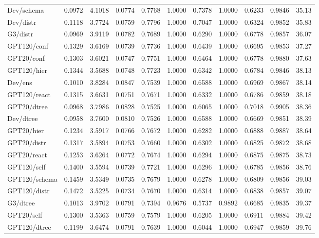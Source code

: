 \begin{table}[t]
\begin{tabular}{lrrrrrrrrrr}
Dev/schema & 0.0972 & 4.1018 & 0.0774 & 0.7768 & 1.0000 & 0.7378 & 1.0000 & 0.6233 & 0.9846 & 35.13 \\
Dev/distr & 0.1118 & 3.7724 & 0.0759 & 0.7796 & 1.0000 & 0.7047 & 1.0000 & 0.6324 & 0.9852 & 35.83 \\
G3/distr & 0.0969 & 3.9119 & 0.0782 & 0.7689 & 1.0000 & 0.6290 & 1.0000 & 0.6778 & 0.9857 & 36.07 \\
GPT120/conf & 0.1329 & 3.6169 & 0.0739 & 0.7736 & 1.0000 & 0.6439 & 1.0000 & 0.6695 & 0.9853 & 37.27 \\
GPT20/conf & 0.1303 & 3.6021 & 0.0747 & 0.7751 & 1.0000 & 0.6464 & 1.0000 & 0.6778 & 0.9880 & 37.63 \\
GPT120/hier & 0.1344 & 3.5688 & 0.0748 & 0.7723 & 1.0000 & 0.6342 & 1.0000 & 0.6784 & 0.9846 & 38.13 \\
Dev/ens & 0.1010 & 3.8284 & 0.0847 & 0.7539 & 1.0000 & 0.6588 & 1.0000 & 0.6969 & 0.9867 & 38.14 \\
GPT120/react & 0.1315 & 3.6631 & 0.0751 & 0.7671 & 1.0000 & 0.6332 & 1.0000 & 0.6786 & 0.9859 & 38.18 \\
GPT20/dtree & 0.0968 & 3.7986 & 0.0828 & 0.7525 & 1.0000 & 0.6065 & 1.0000 & 0.7018 & 0.9905 & 38.36 \\
Dev/dtree & 0.0958 & 3.7600 & 0.0810 & 0.7526 & 1.0000 & 0.6588 & 1.0000 & 0.6669 & 0.9851 & 38.39 \\
GPT20/hier & 0.1234 & 3.5917 & 0.0766 & 0.7672 & 1.0000 & 0.6282 & 1.0000 & 0.6888 & 0.9887 & 38.64 \\
GPT20/distr & 0.1317 & 3.5894 & 0.0753 & 0.7660 & 1.0000 & 0.6302 & 1.0000 & 0.6825 & 0.9872 & 38.68 \\
GPT20/react & 0.1253 & 3.6264 & 0.0772 & 0.7674 & 1.0000 & 0.6294 & 1.0000 & 0.6875 & 0.9875 & 38.73 \\
GPT120/self & 0.1400 & 3.5594 & 0.0739 & 0.7721 & 1.0000 & 0.6296 & 1.0000 & 0.6785 & 0.9856 & 38.76 \\
GPT120/schema & 0.1459 & 3.5349 & 0.0735 & 0.7679 & 1.0000 & 0.6278 & 1.0000 & 0.6809 & 0.9856 & 39.03 \\
GPT120/distr & 0.1472 & 3.5225 & 0.0734 & 0.7670 & 1.0000 & 0.6314 & 1.0000 & 0.6838 & 0.9857 & 39.07 \\
G3/dtree & 0.1013 & 3.9702 & 0.0791 & 0.7394 & 0.9676 & 0.5737 & 0.9892 & 0.6685 & 0.9835 & 39.37 \\
GPT20/self & 0.1300 & 3.5363 & 0.0759 & 0.7579 & 1.0000 & 0.6205 & 1.0000 & 0.6911 & 0.9884 & 39.42 \\
GPT120/dtree & 0.1199 & 3.6474 & 0.0791 & 0.7639 & 1.0000 & 0.6044 & 1.0000 & 0.6947 & 0.9859 & 39.76 \\

\end{tabular}
\end{table}
